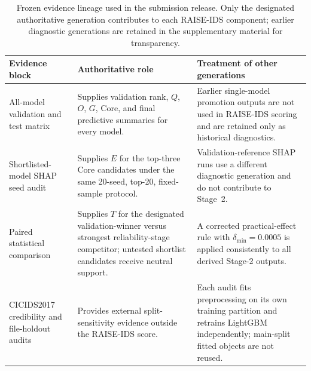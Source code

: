 \begin{table}[!htbp]
\centering
\caption{Frozen evidence lineage used in the submission release. Only the designated authoritative generation contributes to each RAISE-IDS component; earlier diagnostic generations are retained in the supplementary material for transparency.}
\label{tab:result_generation_provenance}
\scriptsize
\begin{tabularx}{\textwidth}{>{\raggedright\arraybackslash}p{3.0cm}>{\raggedright\arraybackslash}p{3.3cm}>{\raggedright\arraybackslash}X}
\toprule
Evidence block & Authoritative role & Treatment of other generations \\
\midrule
All-model validation and test matrix & Supplies validation rank, $Q$, $O$, $G$, Core, and final predictive summaries for every model. & Earlier single-model promotion outputs are not used in RAISE-IDS scoring and are retained only as historical diagnostics. \\
Shortlisted-model SHAP seed audit & Supplies $E$ for the top-three Core candidates under the same 20-seed, top-20, fixed-sample protocol. & Validation-reference SHAP runs use a different diagnostic generation and do not contribute to Stage~2. \\
Paired statistical comparison & Supplies $T$ for the designated validation-winner versus strongest reliability-stage competitor; untested shortlist candidates receive neutral support. & A corrected practical-effect rule with $\delta_{\min}=0.0005$ is applied consistently to all derived Stage-2 outputs. \\
CICIDS2017 credibility and file-holdout audits & Provides external split-sensitivity evidence outside the RAISE-IDS score. & Each audit fits preprocessing on its own training partition and retrains LightGBM independently; main-split fitted objects are not reused. \\
\bottomrule
\end{tabularx}
\end{table}
